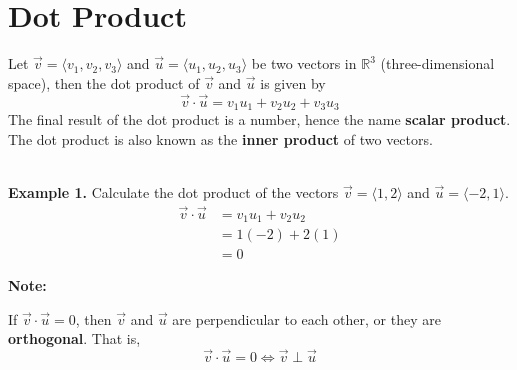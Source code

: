 \documentclass{report}
\begin{document}
\chapter{Dot Product}

Let $\vec{v} = \langle v_1, v_2, v_3 \rangle$ and $\vec{u} = \langle u_1, u_2,
    u_3 \rangle$ be two vectors in $\mathbb{R}^3$ (three-dimensional space), then
the dot product of $\vec{v}$ and $\vec{u}$ is given by \[\vec{v} \cdot \vec{u} = v_1u_1 + v_2u_2 + v_3u_3\]
The final result of the dot product is a number, hence the name \textbf{scalar
    product}. The dot product is also known as the \textbf{inner product} of two
vectors.

~\\ \noindent\textbf{Example 1. } Calculate the dot product of the
vectors $\vec{v} = \langle 1, 2 \rangle$ and $\vec{u} = \langle -2, 1 \rangle$.
\begin{align*}
    \vec{v} \cdot \vec{u} & = v_1u_1 + v_2u_2 \\
                          & = 1(-2) + 2(1)    \\
                          & = 0
\end{align*}
\begin{framed}
    \noindent\textbf{Note: }

    \noindent If $\vec{v} \cdot \vec{u} = 0$, then $\vec{v}$ and $\vec{u}$ are perpendicular to each other, or they are \textbf{orthogonal}. That is,
    \[\vec{v} \cdot \vec{u} = 0 \Longleftrightarrow \vec{v} \perp \vec{u}\]
\end{framed}
\newpage
\end{document}
